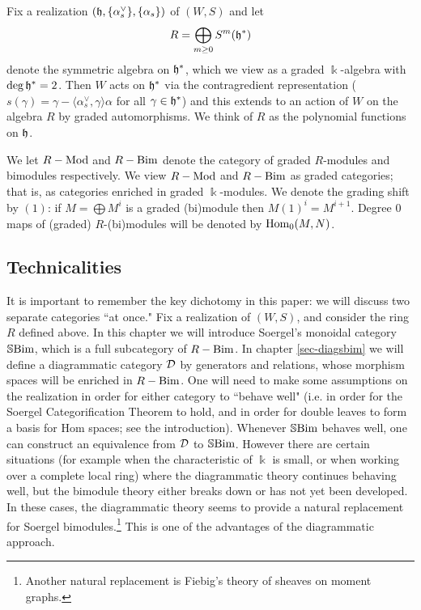 Fix a realization $({\mathfrak h}, \{ \alpha_s^\vee \}, \{ \alpha_s \})$ of $(W,S)$ and let \[ R = \bigoplus_{m \ge 0} S^m({\mathfrak h}^*) \] denote the symmetric algebra on ${\mathfrak h}^*$, which we view as a
graded $\Bbbk$-algebra with $\deg {\mathfrak h}^* = 2$. Then $W$ acts on ${\mathfrak h}^*$ via the contragredient representation ($s(\gamma) = \gamma - \langle \alpha_s^\vee, \gamma \rangle \alpha$ for all
$\gamma \in {\mathfrak h}^*$) and this extends to an action of $W$ on the algebra $R$ by graded automorphisms. We think of $R$ as the polynomial functions on ${\mathfrak h}$.

We let $R-\mathrm{Mod}$ and $R-\mathrm{Bim}$ denote the category of graded $R$-modules and bimodules respectively. We view $R-\mathrm{Mod}$ and $R-\mathrm{Bim}$ as graded categories; that is, as categories enriched in
graded $\Bbbk$-modules. We denote the grading shift by $(1)$: if $M = \bigoplus M^i$ is a graded (bi)module then $M(1)^i = M^{i+1}$. Degree $0$ maps of (graded) $R$-(bi)modules will be
denoted by $\operatorname{Hom}_0(M,N)$.


\subsection{Technicalities}

It is important to remember the key dichotomy in this paper: we will discuss two separate categories ``at once." Fix a realization of $(W,S)$, and consider the ring $R$ defined above. In
this chapter we will introduce Soergel's monoidal category $\mathbb{S}\textrm{Bim}$, which is a full subcategory of $R-\mathrm{Bim}$. In chapter \ref{sec-diagsbim} we will define a diagrammatic category ${\mathcal{D}}$ by
generators and relations, whose morphism spaces will be enriched in $R-\mathrm{Bim}$. One will need to make some assumptions on the realization in order for either category to ``behave well" (i.e.
in order for the Soergel Categorification Theorem to hold, and in order for double leaves to form a basis for Hom spaces; see the introduction). Whenever $\mathbb{S}\textrm{Bim}$ behaves well, one can
construct an equivalence from ${\mathcal{D}}$ to $\mathbb{S}\textrm{Bim}$. However there are certain situations (for example when the characteristic of $\Bbbk$ is small, or when working over a complete local ring)
where the diagrammatic theory continues behaving well, but the bimodule theory either breaks down or has not yet been developed. In these cases, the diagrammatic theory seems to provide a
natural replacement for Soergel bimodules.\footnote{Another natural replacement is Fiebig's theory of sheaves on moment graphs.} This is one of the advantages of
the diagrammatic approach.

